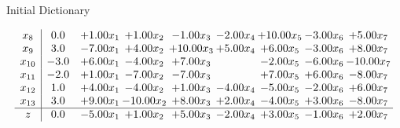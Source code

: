 \documentclass[8pt]{article}
\begin{document}
Initial Dictionary 

\[\begin{array}{c| c c@{\hskip 2pt} c@{\hskip 2pt} c@{\hskip 2pt} c@{\hskip 2pt} c@{\hskip 2pt} c@{\hskip 2pt} c@{\hskip 2pt} }
 x_{8}   &  0.0 & +  1.00 x_{1} & +  1.00 x_{2} & -1.00 x_{3} & -2.00 x_{4} & + 10.00 x_{5} & -3.00 x_{6} & +  5.00 x_{7}\\
 x_{9}   &  3.0 & -7.00 x_{1} & +  4.00 x_{2} & + 10.00 x_{3} & +  5.00 x_{4} & +  6.00 x_{5} & -3.00 x_{6} & +  8.00 x_{7}\\
 x_{10}   &  -3.0 & +  6.00 x_{1} & -4.00 x_{2} & +  7.00 x_{3} &   & -2.00 x_{5} & -6.00 x_{6} & -10.00 x_{7}\\
 x_{11}   &  -2.0 & +  1.00 x_{1} & -7.00 x_{2} & -7.00 x_{3} &   & +  7.00 x_{5} & +  6.00 x_{6} & -8.00 x_{7}\\
 x_{12}   &  1.0 & +  4.00 x_{1} & -4.00 x_{2} & +  1.00 x_{3} & -4.00 x_{4} & -5.00 x_{5} & -2.00 x_{6} & +  6.00 x_{7}\\
 x_{13}   &  3.0 & +  9.00 x_{1} & -10.00 x_{2} & +  8.00 x_{3} & +  2.00 x_{4} & -4.00 x_{5} & +  3.00 x_{6} & -8.00 x_{7}\\
\hline
z    &  0.0 & -5.00 x_{1} & +  1.00 x_{2} & +  5.00 x_{3} & -2.00 x_{4} & +  3.00 x_{5} & -1.00 x_{6} & +  2.00 x_{7}\\
\end{array}\]
\end{document}
